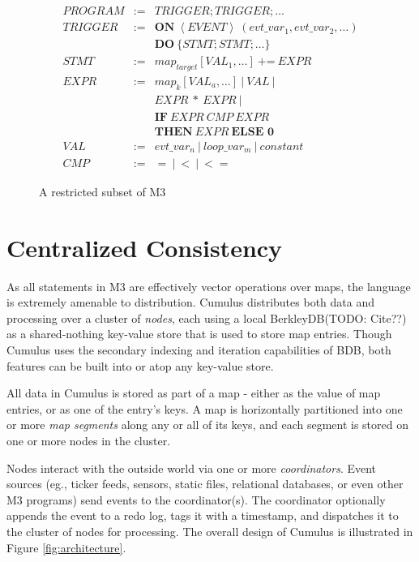 \documentclass{vldb}
\begin{document}
\begin{figure}
\begin{center}
{\small
\begin{eqnarray*}
PROGRAM & := & TRIGGER; TRIGGER; \ldots\\
TRIGGER & := & \textbf{ON}\ \left <EVENT\right>\ ( evt\_var_1, evt\_var_2, \ldots )\\ & & \textbf{DO}\ \{ STMT; STMT; \ldots\}\\
STMT & := & map_{target}[VAL_{1}, \ldots]\ \textbf{+=}\ EXPR\\
EXPR & := & map_{k}[VAL_{a}, \ldots]\ |\ VAL\ |\\&& EXPR\ *\ EXPR\ |\\&& \textbf{IF}\ EXPR\ CMP\ EXPR\\&& \textbf{THEN}\ EXPR\ \textbf{ELSE 0}\\
VAL & := & evt\_var_{n}\ |\ loop\_var_{m}\ |\ constant\\
CMP & := & =\ |\ <\ |\ <=
\end{eqnarray*}}
\caption{A restricted subset of M3}
\label{fig:m3_defn}
\end{center}
\end{figure}



\section{Centralized Consistency}

As all statements in M3 are effectively vector operations over maps, the language is extremely amenable to distribution.  Cumulus distributes both data and processing over a cluster of \textit{nodes}, each using a local BerkleyDB(TODO: Cite??) as a shared-nothing key-value store that is used to store map entries.  Though Cumulus uses the secondary indexing and iteration capabilities of BDB, both features can be built into or atop any key-value store.

All data in Cumulus is stored as part of a map - either as the value of map entries, or as one of the entry's keys.  A map is horizontally partitioned into one or more \textit{map segments} along any or all of its keys, and each segment is stored on one or more nodes in the cluster.

Nodes interact with the outside world via one or more \textit{coordinators}.  Event sources (eg., ticker feeds, sensors, static files, relational databases, or even other M3 programs) send events to the coordinator(s).  The coordinator optionally appends the event to a redo log, tags it with a timestamp, and dispatches it to the cluster of nodes for processing.  The overall design of Cumulus is illustrated in Figure \ref{fig:architecture}.
\end{document}
